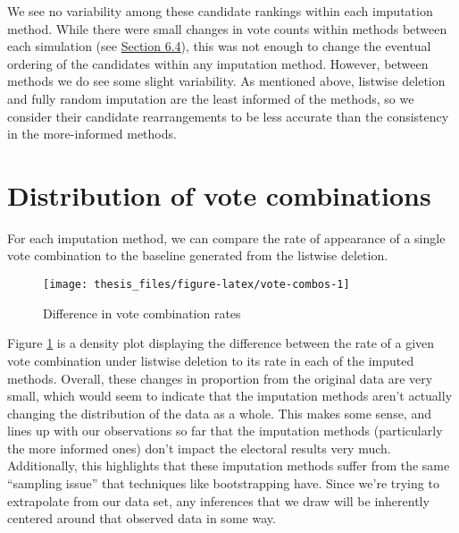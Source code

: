 \documentclass[12pt,twoside]{reedthesis}
\begin{document}
We see no variability among these candidate rankings within each imputation method. While there were small changes in vote counts within methods between each simulation (see \protect\hyperlink{vote-combo-results}{Section 6.4}), this was not enough to change the eventual ordering of the candidates within any imputation method. However, between methods we do see some slight variability. As mentioned above, listwise deletion and fully random imputation are the least informed of the methods, so we consider their candidate rearrangements to be less accurate than the consistency in the more-informed methods.

\hypertarget{vote-combo-results}{%
\section{Distribution of vote combinations}\label{vote-combo-results}}

For each imputation method, we can compare the rate of appearance of a single vote combination to the baseline generated from the listwise deletion.
\begin{figure}
\texttt{[image: thesis\_files/figure-latex/vote-combos-1]} \caption{Difference in vote combination rates}\label{fig:vote-combos}
\end{figure}
Figure \ref{fig:vote-combos} is a density plot displaying the difference between the rate of a given vote combination under listwise deletion to its rate in each of the imputed methods. Overall, these changes in proportion from the original data are very small, which would seem to indicate that the imputation methods aren't actually changing the distribution of the data as a whole. This makes some sense, and lines up with our observations so far that the imputation methods (particularly the more informed ones) don't impact the electoral results very much. Additionally, this highlights that these imputation methods suffer from the same ``sampling issue'' that techniques like bootstrapping have. Since we're trying to extrapolate from our data set, any inferences that we draw will be inherently centered around that observed data in some way.
\end{document}
